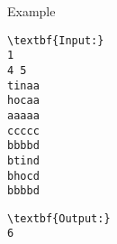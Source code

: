 Example
\begin{verbatim}
\textbf{Input:}
1
4 5
tinaa
hocaa
aaaaa
ccccc
bbbbd
btind
bhocd
bbbbd\end{verbatim}
\begin{verbatim}
\textbf{Output:}
6\end{verbatim}